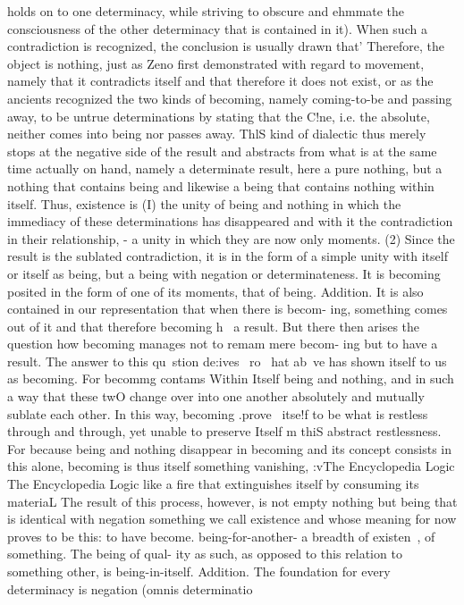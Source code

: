 holds on to one determinacy, while striving to obscure and ehmmate
the consciousness of the other determinacy that is contained in it).
When such a contradiction is recognized, the conclusion is usually
drawn that' Therefore, the object is nothing, just as Zeno first
demonstrated with regard to movement, namely that it contradicts
itself and that therefore it does not exist, or as the ancients
recognized the two kinds of becoming, namely coming-to-be and
passing away, to be untrue determinations by stating that the C!ne,
i.e. the absolute, neither comes into being nor passes away. ThlS
kind of dialectic thus merely stops at the negative side of the result
and abstracts from what is at the same time actually on hand,
namely a determinate result, here a pure nothing, but a nothing that
contains being and likewise a being that contains nothing within
itself. Thus, existence is (I) the unity of being and nothing in
which the immediacy of these determinations has disappeared and
with it the contradiction in their relationship, - a unity in which
they are now only moments. (2) Since the result is the sublated
contradiction, it is in the form of a simple unity with itself or itself as
being, but a being with negation or determinateness. It is becoming
posited in the form of one of its moments, that of being.
Addition. It is also contained in our representation that when there is becom-
ing, something comes out of it and that therefore becoming h~ a result. But
there then arises the question how becoming manages not to remam mere becom-
ing but to have a result. The answer to this qu~stion de:ives ~ro~ hat ab~ve
has shown itself to us as becoming. For becommg contams Within Itself being
and nothing, and in such a way that these twO change over into one another
absolutely and mutually sublate each other. In this way, becoming .prove~ itse!f
to be what is restless through and through, yet unable to preserve Itself m thiS
abstract restlessness. For because being and nothing disappear in becoming and
its concept consists in this alone, becoming is thus itself something vanishing,
:vThe Encyclopedia Logic The Encyclopedia Logic
like a fire that extinguishes itself by consuming its materiaL The result of this
process, however, is not empty nothing but being that is identical with negation
something we call existence and whose meaning for now proves to be this: to have
become. being-for-another- a breadth of existen~, of something. The being of qual-
ity as such, as opposed to this relation to something other, is being-in-itself.
Addition. The foundation for every determinacy is negation (omnis determinatio
